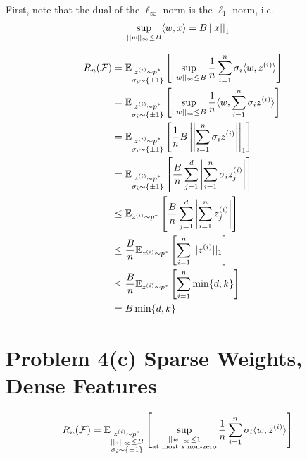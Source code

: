 \documentclass[11pt]{article}
\newcommand{\1}{\mathbb{I}} %
\begin{document}
First, note that the dual of the $\ell_{\infty}$-norm is the $\ell_1$-norm, i.e.
\begin{align}
	\sup_{\inftynorm{w} \leq B} \langle w, x \rangle 
		&= B \norm[1]{x}
\end{align}

\begin{align}
	R_n(\mathcal  F)
		&= \E[\substack{ \ival[i]{z}  \sim p^* \\ \sigma_i \sim \{ \pm 1\}}]{\sup_{ ||w||_{\infty} \leq B  } \inv{n} \insum \sigma_i \langle w, z^{(i)} \rangle } \\
		&= \E[\substack{ \ival[i]{z}  \sim p^* \\ \sigma_i \sim \{ \pm 1\}}]{\sup_{ ||w||_{\infty} \leq B  } \inv{n}\langle w,  \insum  \sigma_i z^{(i)} \rangle } \\
		&= \E[\substack{ \ival[i]{z}  \sim p^* \\ \sigma_i \sim \{ \pm 1\}}]{ \inv{n} B \norm[1]{  \insum  \sigma_i z^{(i)}  } } \\
		&=  \E[\substack{ \ival[i]{z}  \sim p^* \\ \sigma_i \sim \{ \pm 1\}}]{ \frac{B}{n} \sum_{j=1}^{d}  \left| \insum  \sigma_i z^{(i)}_j  \right| }  \\
		&\leq \E[z^{(i)} \sim p^*]{ \frac{B}{n} \sum_{j=1}^{d}  \left| \insum z^{(i)}_j  \right| }  \\
		&\leq \frac{B}{n} \E[z^{(i)} \sim p^*]{\insum ||z^{(i)}||_1 } \\
		&\leq \frac{B}{n} \E[z^{(i)} \sim p^*]{\insum \min\{ d, k \}  } \\
		&= B \min\{ d, k\}
\end{align}

\clearpage 
\section*{Problem 4(c)  Sparse Weights, Dense Features}

\begin{align}
	R_n(\mathcal F)
		&= \E[\substack{z^{(i)} \sim p^* \\ \inftynorm{z} \leq B \\ \sigma_i \sim \{\pm 1\}}]{   \sup_{\substack{\inftynorm{w} \leq 1 \\  \text{at most }s \text{ non-zero} } } \inv{n} \insum \sigma_i \langle w, z^{(i)} \rangle  }
\end{align}
\end{document}
